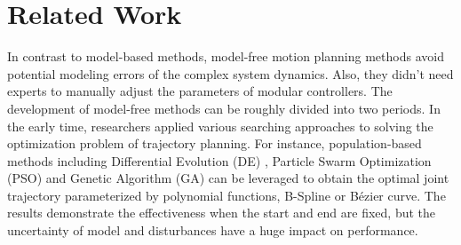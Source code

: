 \documentclass{article}
\begin{document}
\section{Related Work}

In contrast to model-based methods, model-free motion planning methods avoid potential modeling errors of the complex system dynamics. Also, they didn't need experts to manually adjust the parameters of modular controllers. The development of model-free methods can be roughly divided into two periods. In the early time, researchers applied various searching approaches to solving the optimization problem of trajectory planning. For instance, population-based methods including Differential Evolution (DE) \cite{WANG20181525}, Particle Swarm Optimization (PSO) \cite{wang2015trajectory} and Genetic Algorithm (GA) \cite{chen2017path} can be leveraged to obtain the optimal joint trajectory parameterized by polynomial functions, B-Spline or Bézier curve. The results demonstrate the effectiveness when the start and end are fixed, but the uncertainty of model and disturbances have a huge impact on performance. 
\end{document}
